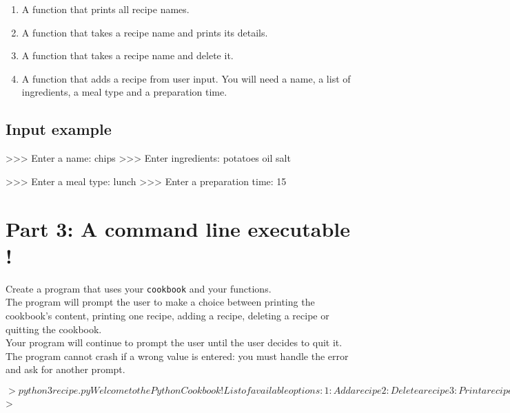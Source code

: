 \begin{enumerate}
	\item A function that prints all recipe names.
	\item A function that takes a recipe name and prints its details.
	\item A function that takes a recipe name and delete it.
	\item A function that adds a recipe from user input. You will need a name, a list of ingredients, a meal type and a preparation time.
\end{enumerate}
\subsection*{Input example}
\begin{42console}
>>> Enter a name:
chips
>>> Enter ingredients:
potatoes
oil
salt

>>> Enter a meal type:
lunch
>>> Enter a preparation time:
15
\end{42console}

\section*{Part 3: A command line executable !}

Create a program that uses your \texttt{cookbook} and your functions.\\
\newline
The program will prompt the user to make a choice between printing the cookbook's content,
 printing one recipe, adding a recipe, deleting a recipe or quitting the cookbook.\\
\newline
Your program will continue to prompt the user until the user decides to quit it.\\
\newline
The program cannot crash if a wrong value is entered: you must handle the error and ask for another prompt.\\

\begin{42console}
$> python3 recipe.py
Welcome to the Python Cookbook !
List of available options:
   1: Add a recipe
   2: Delete a recipe
   3: Print a recipe
   4: Print the cookbook
   5: Quit

Please select an option:
>> 3

Please enter a recipe name to get its details:
>> cake

Recipe for cake:
   Ingredients list: ['flour', 'sugar', 'eggs']
   To be eaten for dessert.
   Takes 60 minutes of cooking.

Please select an option:
>> Hello

Sorry, this option does not exist.
List of available options:
   1: Add a recipe
   2: Delete a recipe
   3: Print a recipe
   4: Print the cookbook
   5: Quit

Please select an option:
>> 5

Cookbook closed. Goodbye !
$>
\end{42console}